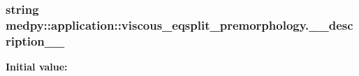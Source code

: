\hypertarget{namespacemedpy_1_1application_1_1viscous__eqsplit__premorphology_ab247ec3bad4c99b0909c75dd01d6f6d1}{
\subsubsection[{\_\-\_\-description\_\-\_\-}]{\setlength{\rightskip}{0pt plus 5cm}string {\bf medpy::application::viscous\_\-eqsplit\_\-premorphology.\_\-\_\-description\_\-\_\-}}}
\label{namespacemedpy_1_1application_1_1viscous__eqsplit__premorphology_ab247ec3bad4c99b0909c75dd01d6f6d1}
{\bfseries Initial value:}
